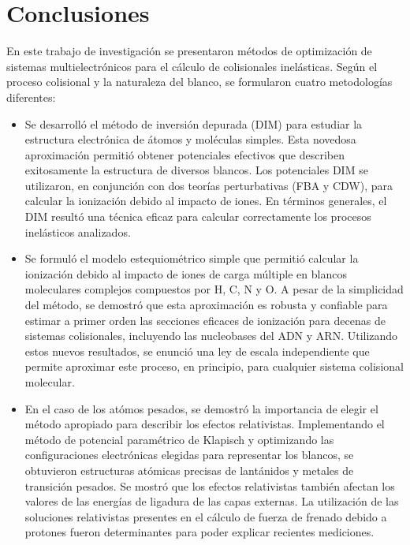 \chapter*{Conclusiones}%
%

En este trabajo de investigación se presentaron métodos de 
optimización de sistemas multielectrónicos para el cálculo de 
colisionales inelásticas. Según el proceso colisional y la naturaleza 
del blanco, se formularon cuatro metodologías diferentes:
\begin{itemize}
\item 
Se desarrolló el método de inversión depurada (DIM) para estudiar la 
estructura electrónica de átomos y moléculas simples. Esta novedosa 
aproximación permitió obtener potenciales efectivos que describen 
exitosamente la estructura de diversos blancos. Los potenciales DIM se 
utilizaron, en conjunción con dos teorías perturbativas (FBA y CDW), 
para calcular la ionización debido al impacto de iones. En términos 
generales, el DIM resultó una técnica eficaz para calcular correctamente 
los procesos inelásticos analizados.

\item
Se formuló el modelo estequiométrico simple que permitió calcular la 
ionización debido al impacto de iones de carga múltiple en blancos 
moleculares complejos compuestos por H, C, N y O. A pesar de la 
simplicidad del método, se demostró que esta aproximación es robusta y 
confiable para estimar a primer orden las secciones eficaces de 
ionización para decenas de sistemas colisionales, incluyendo las 
nucleobases del ADN y ARN. Utilizando estos nuevos resultados, se 
enunció una ley de escala independiente que permite aproximar este 
proceso, en principio, para cualquier sistema colisional molecular.

\item
En el caso de los atómos pesados, se demostró la importancia de elegir el 
método apropiado para describir los efectos relativistas. Implementando 
el método de potencial paramétrico de Klapisch y optimizando las 
configuraciones electrónicas elegidas para representar los blancos, se 
obtuvieron estructuras atómicas precisas de lantánidos y metales de 
transición pesados. Se mostró que los efectos relativistas también 
afectan los valores de las energías de ligadura de las capas externas. 
La utilización de las soluciones relativistas presentes en el cálculo de 
fuerza de frenado debido a protones fueron determinantes para poder 
explicar recientes mediciones.


\end{itemize}
